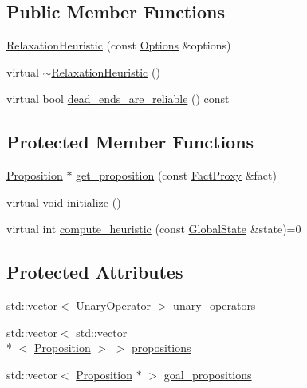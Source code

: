 \subsection*{Public Member Functions}
\begin{DoxyCompactItemize}
\item 
\hyperlink{classRelaxationHeuristic_accaab2791b2037b1d3d703d69d40a16b}{Relaxation\-Heuristic} (const \hyperlink{classOptions}{Options} \&options)
\item 
virtual \hyperlink{classRelaxationHeuristic_ab52c2bad0d4cdffdff5d671065a4b77e}{$\sim$\-Relaxation\-Heuristic} ()
\item 
virtual bool \hyperlink{classRelaxationHeuristic_a2e924767171bcbef35aa5b88236edf70}{dead\-\_\-ends\-\_\-are\-\_\-reliable} () const 
\end{DoxyCompactItemize}
\subsection*{Protected Member Functions}
\begin{DoxyCompactItemize}
\item 
\hyperlink{structProposition}{Proposition} $\ast$ \hyperlink{classRelaxationHeuristic_a4b523d3a9322d516c305095f6e13e27e}{get\-\_\-proposition} (const \hyperlink{classFactProxy}{Fact\-Proxy} \&fact)
\item 
virtual void \hyperlink{classRelaxationHeuristic_aa34cc79d9e5e3e9aff4c4ed1b03a853e}{initialize} ()
\item 
virtual int \hyperlink{classRelaxationHeuristic_a7455dfe0d43241c0f0769db91ee87ec3}{compute\-\_\-heuristic} (const \hyperlink{classGlobalState}{Global\-State} \&state)=0
\end{DoxyCompactItemize}
\subsection*{Protected Attributes}
\begin{DoxyCompactItemize}
\item 
std\-::vector$<$ \hyperlink{structUnaryOperator}{Unary\-Operator} $>$ \hyperlink{classRelaxationHeuristic_a9e94cfa3f8d37fe029b2ac1df7fb6d39}{unary\-\_\-operators}
\item 
std\-::vector$<$ std\-::vector\\*
$<$ \hyperlink{structProposition}{Proposition} $>$ $>$ \hyperlink{classRelaxationHeuristic_af14ac5ca803abbcad071fd0a84d1ea7b}{propositions}
\item 
std\-::vector$<$ \hyperlink{structProposition}{Proposition} $\ast$ $>$ \hyperlink{classRelaxationHeuristic_a0d1cf8a6bc1f7fff5821cfe40458bc53}{goal\-\_\-propositions}
\end{DoxyCompactItemize}
